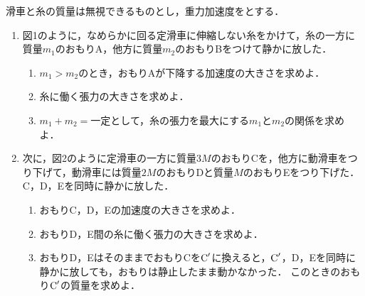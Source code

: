 滑車と糸の質量は無視できるものとし，重力加速度を\g とする．

\begin{enumerate}[〔A〕]
  \setlength{\leftskip}{-1.5zw}
  \setlength{\itemindent}{1zw}\setlength{\labelsep}{0.5zw}
  \setlength{\labelwidth}{1zw}\setlength{\leftmargin}{1zw}
  \setlength{\itemsep}{0.5\baselineskip}
  \item 図1のように，なめらかに回る定滑車に伸縮しない糸をかけて，糸の一方に質量$m_1$のおもりA，他方に質量$m_2$のおもりBをつけて静かに放した．
  \begin{enumerate}[（1）]
    \setlength{\leftskip}{-2.5zw}
    \setlength{\itemindent}{1zw}\setlength{\labelsep}{1zw}
    \setlength{\labelwidth}{1zw}
    \item $m_1 > m_2$のとき，おもりAが下降する加速度の大きさを求めよ．
    \item 糸に働く張力の大きさを求めよ．
    \item $m_1 + m_2 = \text{一定}$として，糸の張力を最大にする$m_1$と$m_2$の関係を求めよ．
  \end{enumerate}
  \item 次に，図2のように定滑車の一方に質量$3M$のおもりCを，他方に動滑車をつり下げて，動滑車には質量$2M$のおもりDと質量$M$のおもりEをつり下げた．C，D，Eを同時に静かに放した．
  \begin{enumerate}[（1）]
    \setlength{\leftskip}{-2.5zw}
    \setlength{\itemindent}{1zw}\setlength{\labelsep}{1zw}
    \setlength{\labelwidth}{1zw}
    \item おもりC，D，Eの加速度の大きさを求めよ．
    \item おもりD，E間の糸に働く張力の大きさを求めよ．
    \item おもりD，EはそのままでおもりCを$\textup{C}^\prime$に換えると，$\textup{C}^\prime$，D，Eを同時に静かに放しても，おもりは静止したまま動かなかった．
    このときのおもり$\textup{C}^\prime$の質量を求めよ．
  \end{enumerate}
\end{enumerate}

